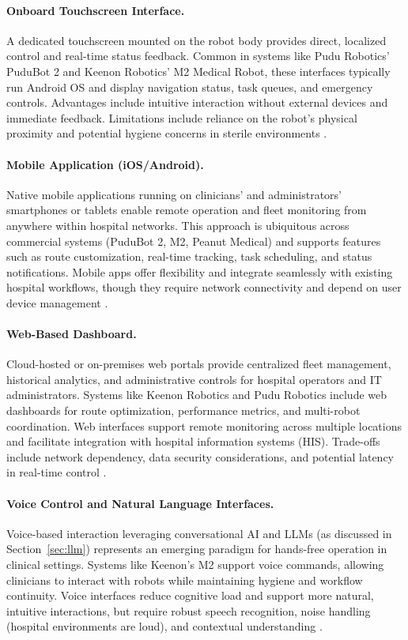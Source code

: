\paragraph{Onboard Touchscreen Interface.}
A dedicated touchscreen mounted on the robot body provides direct, localized control and real-time status feedback. Common in systems like Pudu Robotics' PuduBot 2 and Keenon Robotics' M2 Medical Robot, these interfaces typically run Android OS and display navigation status, task queues, and emergency controls. Advantages include intuitive interaction without external devices and immediate feedback. Limitations include reliance on the robot's physical proximity and potential hygiene concerns in sterile environments \cite{m2medical}.

\paragraph{Mobile Application (iOS/Android).}
Native mobile applications running on clinicians' and administrators' smartphones or tablets enable remote operation and fleet monitoring from anywhere within hospital networks. This approach is ubiquitous across commercial systems (PuduBot 2, M2, Peanut Medical) and supports features such as route customization, real-time tracking, task scheduling, and status notifications. Mobile apps offer flexibility and integrate seamlessly with existing hospital workflows, though they require network connectivity and depend on user device management \cite{pudubot2}.

\paragraph{Web-Based Dashboard.}
Cloud-hosted or on-premises web portals provide centralized fleet management, historical analytics, and administrative controls for hospital operators and IT administrators. Systems like Keenon Robotics and Pudu Robotics include web dashboards for route optimization, performance metrics, and multi-robot coordination. Web interfaces support remote monitoring across multiple locations and facilitate integration with hospital information systems (HIS). Trade-offs include network dependency, data security considerations, and potential latency in real-time control \cite{puducc1}.

\paragraph{Voice Control and Natural Language Interfaces.}
Voice-based interaction leveraging conversational AI and LLMs (as discussed in Section~\ref{sec:llm}) represents an emerging paradigm for hands-free operation in clinical settings. Systems like Keenon's M2 support voice commands, allowing clinicians to interact with robots while maintaining hygiene and workflow continuity. Voice interfaces reduce cognitive load and support more natural, intuitive interactions, but require robust speech recognition, noise handling (hospital environments are loud), and contextual understanding \cite{musick2025}.

